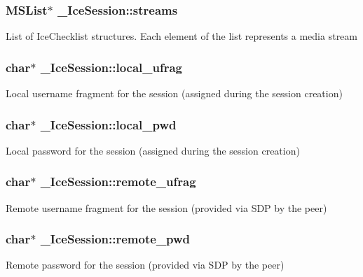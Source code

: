 \subsubsection[{streams}]{\setlength{\rightskip}{0pt plus 5cm}M\-S\-List$\ast$ \-\_\-\-Ice\-Session\-::streams}\label{struct__IceSession_ab05c8d1301b5d38bb4bc09d9a12a5369}
List of Ice\-Checklist structures. Each element of the list represents a media stream 
\subsubsection[{local\-\_\-ufrag}]{\setlength{\rightskip}{0pt plus 5cm}char$\ast$ \-\_\-\-Ice\-Session\-::local\-\_\-ufrag}\label{struct__IceSession_a25a86fb6bbe126c11e8f3081b6ffb3ad}
Local username fragment for the session (assigned during the session creation) 
\subsubsection[{local\-\_\-pwd}]{\setlength{\rightskip}{0pt plus 5cm}char$\ast$ \-\_\-\-Ice\-Session\-::local\-\_\-pwd}\label{struct__IceSession_aae2c15f2276b71df770d6f28e368a5be}
Local password for the session (assigned during the session creation) 
\subsubsection[{remote\-\_\-ufrag}]{\setlength{\rightskip}{0pt plus 5cm}char$\ast$ \-\_\-\-Ice\-Session\-::remote\-\_\-ufrag}\label{struct__IceSession_a1c31f66a6a483f6bef1fd41cba354755}
Remote username fragment for the session (provided via S\-D\-P by the peer) 
\subsubsection[{remote\-\_\-pwd}]{\setlength{\rightskip}{0pt plus 5cm}char$\ast$ \-\_\-\-Ice\-Session\-::remote\-\_\-pwd}\label{struct__IceSession_a02b6c6bf7d1aeca916226f37ac074645}
Remote password for the session (provided via S\-D\-P by the peer) 

